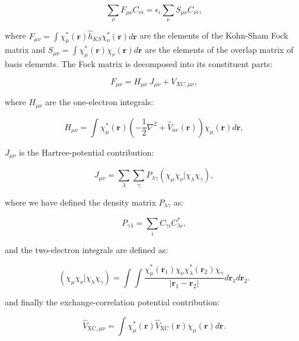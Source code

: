 \begin{equation}
 \sum_{\nu} F_{\mu\nu} C_{\nu i} =
    \epsilon_i \sum_{\nu} S_{\mu\nu} C_{\nu i} , 
\end{equation}

where $F_{\mu\nu} = \int \chi_{\mu}^*(\bm{r}) \hat{h}_{KS}
\chi_{\nu}^*(\bm{r}) d\bm{r} $ are the elements of the Kohn-Sham
Fock matrix and $S_{\mu\nu} = \int \chi_{\mu}^*(\bm{r}) \chi_{\nu}
(\bm{r}) d\bm{r}$ are the elements of the overlap matrix
of basis elements.
The Fock matrix is decomposed into its constituent parts:

\begin{equation}
F_{\mu\nu} = H_{\mu\nu} \ J_{\mu\nu} + V_{XC,\mu\nu} ,
\end{equation}

where $H_{\mu\nu}$ are the one-electron integrals:

\begin{equation}
H_{\mu\nu} = \int \chi_{\mu}^*(\bm{r})
    \left( -\frac{1}{2} \nabla^2 + \hat{V}_{ne}(\bm{r}) \right)
    \chi_{\mu}(\bm{r}) d\bm{r} ,
\end{equation}

$J_{\mu\nu}$ is the Hartree-potential contribution:

\begin{equation}
    J_{\mu\nu} = \sum_{\lambda} \sum_{\gamma} P_{\lambda\gamma}
    \left(\chi_{\mu}\chi_{\nu} | \chi_{\lambda}\chi_{\gamma}\right) ,
\end{equation}

where we have defined the density matrix $P_{\lambda\gamma}$ as:

\begin{equation}
P_{\gamma\lambda} = \sum_i C_{\gamma i} C_{\lambda i}^* ,
\end{equation}

and the two-electron integrals are defined as:

\begin{equation}
\left(\chi_{\mu}\chi_{\nu} | \chi_{\lambda}\chi_{\gamma}\right)
    = \int \int \frac{\chi_{\mu}^*(\bm{r}_1) \chi_{\nu}
    \chi_{\lambda}^*(\bm{r}_2) \chi_{\gamma}}
    {\left| \bm{r}_1 - \bm{r}_2 \right|}
    d\bm{r}_1 d\bm{r}_2 .
\end{equation}

and finally the exchange-correlation potential contribution:

\begin{equation}
\hat{V}_{\text{XC},\mu\nu} = \int \chi_{\mu}^*(\bm{r})
    \hat{V}_{\text{XC}}(\bm{r}) \chi_{\mu}(\bm{r}) d\bm{r} .
\end{equation}

